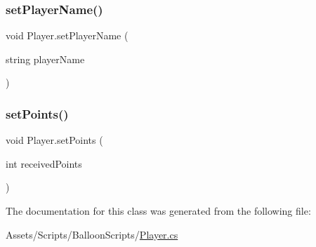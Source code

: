 \subsubsection{\texorpdfstring{set\+Player\+Name()}{setPlayerName()}}
{\footnotesize\ttfamily void Player.\+set\+Player\+Name (\begin{DoxyParamCaption}\item[{string}]{player\+Name }\end{DoxyParamCaption})\hspace{0.3cm}{\ttfamily [inline]}}

\mbox{\label{classPlayer_a8d2d50dfbb6e990cdb52a2edaa4edd8a}} 
\subsubsection{\texorpdfstring{set\+Points()}{setPoints()}}
{\footnotesize\ttfamily void Player.\+set\+Points (\begin{DoxyParamCaption}\item[{int}]{received\+Points }\end{DoxyParamCaption})\hspace{0.3cm}{\ttfamily [inline]}}



The documentation for this class was generated from the following file\+:\begin{DoxyCompactItemize}
\item 
Assets/\+Scripts/\+Balloon\+Scripts/\hyperlink{Player_8cs}{Player.\+cs}\end{DoxyCompactItemize}
